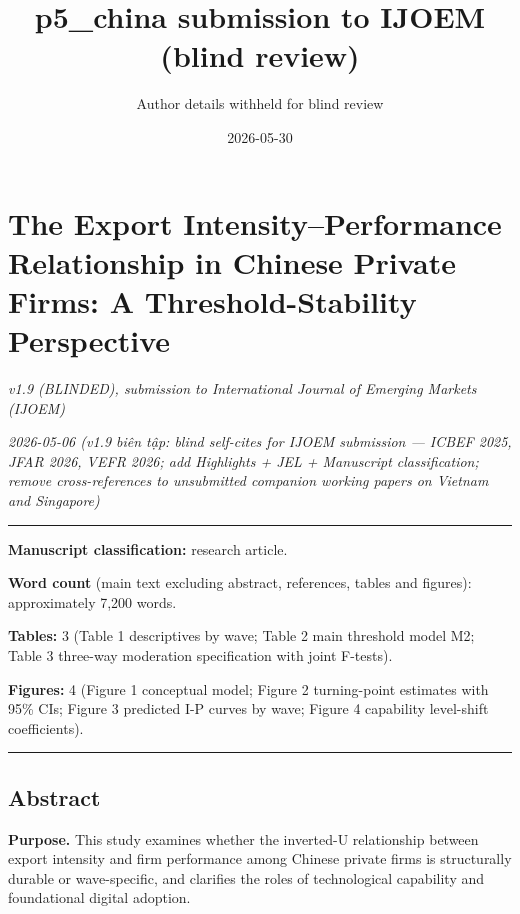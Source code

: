 \documentclass[12pt,a4paper]{article}
\title{p5\_china submission to IJOEM (blind review)}
\author{Author details withheld for blind review}
\date{2026-05-30}
\begin{document}
\maketitle

\hypertarget{the-export-intensityperformance-relationship-in-chinese-private-firms-a-threshold-stability-perspective}{%
\section{The Export Intensity--Performance Relationship in Chinese
Private Firms: A Threshold-Stability
Perspective}\label{the-export-intensityperformance-relationship-in-chinese-private-firms-a-threshold-stability-perspective}}

\emph{v1.9 (BLINDED), submission to International Journal of Emerging
Markets (IJOEM)}

\emph{2026-05-06 (v1.9 biên tập: blind self-cites for IJOEM submission
--- ICBEF 2025, JFAR 2026, VEFR 2026; add Highlights + JEL + Manuscript
classification; remove cross-references to unsubmitted companion working
papers on Vietnam and Singapore)}

\begin{center}\rule{0.5\linewidth}{0.5pt}\end{center}

\textbf{Manuscript classification:} research article.

\textbf{Word count} (main text excluding abstract, references, tables
and figures): approximately 7,200 words.

\textbf{Tables:} 3 (Table 1 descriptives by wave; Table 2 main threshold
model M2; Table 3 three-way moderation specification with joint
F-tests).

\textbf{Figures:} 4 (Figure 1 conceptual model; Figure 2 turning-point
estimates with 95\% CIs; Figure 3 predicted I-P curves by wave; Figure 4
capability level-shift coefficients).

\begin{center}\rule{0.5\linewidth}{0.5pt}\end{center}

\hypertarget{abstract}{%
\subsection{Abstract}\label{abstract}}

\textbf{Purpose.} This study examines whether the inverted-U
relationship between export intensity and firm performance among Chinese
private firms is structurally durable or wave-specific, and clarifies
the roles of technological capability and foundational digital adoption.
\end{document}

